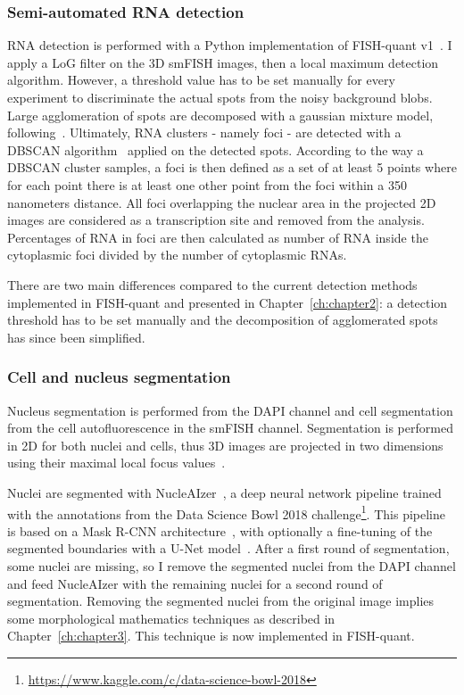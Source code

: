 \subsubsection{Semi-automated RNA detection}

\ac{RNA} detection is performed with a Python implementation of FISH-quant v1~\cite{mueller_fish-quant_2013}.
I apply a \ac{LoG} filter on the 3D \ac{smFISH} images, then a local maximum detection algorithm.
However, a threshold value has to be set manually for every experiment to discriminate the actual spots from the noisy background blobs.
Large agglomeration of spots are decomposed with a gaussian mixture model, following~\cite{samacoits_computational_2018}.
Ultimately, \ac{RNA} clusters - namely foci - are detected with a DBSCAN algorithm~\cite{ester_density-based_1996} applied on the detected spots.
According to the way a DBSCAN cluster samples, a foci is then defined as a set of at least 5 points where for each point there is at least one other point from the foci within a 350 nanometers distance.
All foci overlapping the nuclear area in the projected 2D images are considered as a transcription site and removed from the analysis.
Percentages of \ac{RNA} in foci are then calculated as number of \ac{RNA} inside the cytoplasmic foci divided by the number of cytoplasmic \ac{RNA}s.

There are two main differences compared to the current detection methods implemented in FISH-quant and presented in Chapter~\ref{ch:chapter2}: a detection threshold has to be set manually and the decomposition of agglomerated spots has since been simplified.

\subsubsection{Cell and nucleus segmentation}

Nucleus segmentation is performed from the DAPI channel and cell segmentation from the cell autofluorescence in the \ac{smFISH} channel.
Segmentation is performed in 2D for both nuclei and cells, thus 3D images are projected in two dimensions using their maximal local focus values~\cite{tsanov_smifish_2016}.

Nuclei are segmented with NucleAIzer~\cite{hollandi_nucleaizer_2020}, a deep neural network pipeline trained with the annotations from the Data Science Bowl 2018 challenge\footnote{\url{https://www.kaggle.com/c/data-science-bowl-2018}}.
This pipeline is based on a Mask R-CNN architecture~\cite{He_2017_ICCV}, with optionally a fine-tuning of the segmented boundaries with a U-Net model~\cite{Ronneberger_unet}.
After a first round of segmentation, some nuclei are missing, so I remove the segmented nuclei from the DAPI channel and feed NucleAIzer with the remaining nuclei for a second round of segmentation.
Removing the segmented nuclei from the original image implies some morphological mathematics techniques as described in Chapter~\ref{ch:chapter3}.
This technique is now implemented in FISH-quant.

